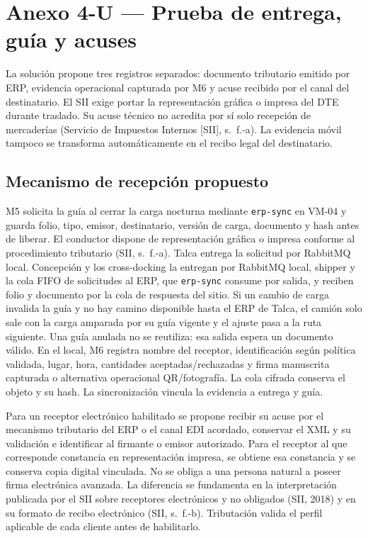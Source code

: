 \clearpage
\section*{Anexo 4-U — Prueba de entrega, guía y acuses}
\label{fuente-24-anexo-4-1-u-evidencia-documental}
\label{anx:U}
La solución propone tres registros separados: documento tributario emitido por ERP, evidencia operacional capturada por M6 y acuse recibido por el canal del destinatario. El SII exige portar la representación gráfica o impresa del DTE durante traslado. Su acuse técnico no acredita por sí solo recepción de mercaderías (Servicio de Impuestos Internos [SII], s.~f.-a). La evidencia móvil tampoco se transforma automáticamente en el recibo legal del destinatario.

\subsection*{Mecanismo de recepción propuesto}
M5 solicita la guía al cerrar la carga nocturna mediante \texttt{erp-sync} en VM-04 y guarda folio, tipo, emisor, destinatario, versión de carga, documento y hash antes de liberar. El conductor dispone de representación gráfica o impresa conforme al procedimiento tributario (SII, s.~f.-a). Talca entrega la solicitud por RabbitMQ local. Concepción y los cross-docking la entregan por RabbitMQ local, shipper y la cola FIFO de solicitudes al ERP, que \texttt{erp-sync} consume por salida, y reciben folio y documento por la cola de respuesta del sitio. Si un cambio de carga invalida la guía y no hay camino disponible hasta el ERP de Talca, el camión solo sale con la carga amparada por su guía vigente y el ajuste pasa a la ruta siguiente. Una guía anulada no se reutiliza: esa salida espera un documento válido. En el local, M6 registra nombre del receptor, identificación según política validada, lugar, hora, cantidades aceptadas/rechazadas y firma manuscrita capturada o alternativa operacional QR/fotografía. La cola cifrada conserva el objeto y su hash. La sincronización vincula la evidencia a entrega y guía.

Para un receptor electrónico habilitado se propone recibir su acuse por el mecanismo tributario del ERP o el canal EDI acordado, conservar el XML y su validación e identificar al firmante o emisor autorizado. Para el receptor al que corresponde constancia en representación impresa, se obtiene esa constancia y se conserva copia digital vinculada. No se obliga a una persona natural a poseer firma electrónica avanzada. La diferencia se fundamenta en la interpretación publicada por el SII sobre receptores electrónicos y no obligados (SII, 2018) y en su formato de recibo electrónico (SII, s.~f.-b). Tributación valida el perfil aplicable de cada cliente antes de habilitarlo.

